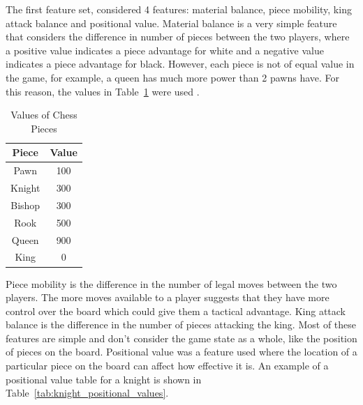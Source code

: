 The first feature set, considered 4 features: material balance, piece mobility, king attack balance and positional value. Material balance is a very simple feature that considers the difference in number of pieces between the two players, where a positive value indicates a piece advantage for white and a negative value indicates a piece advantage for black. However, each piece is not of equal value in the game, for example, a queen has much more power than 2 pawns have. For this reason, the values in Table~\ref{tab:piece_values} were used \cite{shannonXXIIProgrammingComputer1950} \cite{drosteLearningPieceValues}. 


\begin{table}[h]
    \centering
    \begin{tabular}{|c|c|}
        \hline
        \textbf{Piece} & \textbf{Value} \\
        \hline
        Pawn & 100 \\
        Knight & 300 \\
        Bishop & 300 \\
        Rook & 500 \\
        Queen & 900 \\
        King & 0 \\
        \hline
    \end{tabular}
    \caption{Values of Chess Pieces}
    \label{tab:piece_values}
\end{table}

Piece mobility is the difference in the number of legal moves between the two players. The more moves available to a player suggests that they have more control over the board which could give them a tactical advantage. King attack balance is the difference in the number of pieces attacking the king. Most of these features are simple and don't consider the game state as a whole, like the position of pieces on the board. Positional value was a feature used where the location of a particular piece on the board can affect how effective it is. An example of a positional value table for a knight is shown in Table~\ref{tab:knight_positional_values}.

